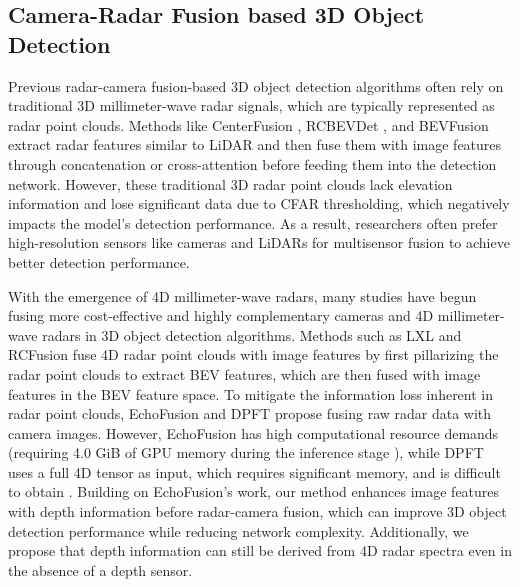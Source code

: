 \subsection{Camera-Radar Fusion based 3D Object Detection}
Previous radar-camera fusion-based 3D object detection algorithms often rely on traditional 3D millimeter-wave radar signals, 
which are typically represented as radar point clouds. 
Methods like CenterFusion \cite{centerfusion}, RCBEVDet \cite{rcbevdet}, and BEVFusion \cite{bevfusion} 
extract radar features similar to LiDAR and then fuse them with image features through concatenation or cross-attention before feeding them into the detection network. 
However, these traditional 3D radar point clouds lack elevation information and lose significant data due to CFAR thresholding, 
which negatively impacts the model’s detection performance. 
As a result, researchers often prefer high-resolution sensors like cameras and LiDARs for multisensor fusion to achieve better detection performance.

With the emergence of 4D millimeter-wave radars, 
many studies have begun fusing more cost-effective and highly complementary cameras and 4D millimeter-wave radars in 3D object detection algorithms.
Methods such as LXL \cite{lxl} and RCFusion \cite{rcfusion} 
fuse 4D radar point clouds with image features by first pillarizing the radar point clouds to extract BEV features, 
which are then fused with image features in the BEV feature space.
To mitigate the information loss inherent in radar point clouds, 
EchoFusion \cite{echofusion} and DPFT \cite{dpft} propose fusing raw radar data with camera images. 
However, EchoFusion has high computational resource demands (requiring 4.0 GiB of GPU memory during the inference stage \cite{dpft}), 
while DPFT uses a full 4D tensor as input, which requires significant memory, and is difficult to obtain \cite{k-radar}. 
Building on EchoFusion's work, 
our method enhances image features with depth information before radar-camera fusion, 
which can improve 3D object detection performance while reducing network complexity. 
Additionally, we propose that depth information can still be derived from 4D radar spectra even in the absence of a depth sensor.

